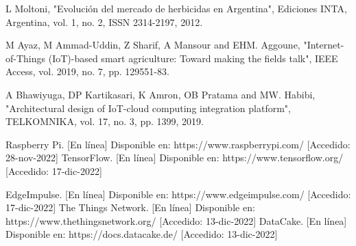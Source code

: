 \documentclass[conference]{IEEEtran}
\begin{document}
\begin{thebibliography}{00}
 L Moltoni, "Evolución del mercado de herbicidas en Argentina", Ediciones INTA, Argentina, vol. 1, no. 2, ISSN 2314-2197, 2012.


 M Ayaz, M Ammad-Uddin, Z Sharif, A Mansour and EHM. Aggoune, "Internet-of-Things (IoT)-based smart agriculture: Toward making the fields talk", IEEE Access, vol. 2019, no. 7, pp. 129551-83.

 A Bhawiyuga, DP Kartikasari, K Amron, OB Pratama and MW. Habibi, "Architectural design of IoT-cloud computing integration platform", TELKOMNIKA, vol. 17, no. 3, pp. 1399, 2019.

 Raspberry Pi. [En línea] Disponible en:
https://www.raspberrypi.com/ [Accedido: 28-nov-2022]  
 TensorFlow. [En línea] Disponible en: https://www.tensorflow.org/ [Accedido: 17-dic-2022] 

 EdgeImpulse. [En línea] Disponible en: https://www.edgeimpulse.com/ [Accedido: 17-dic-2022]
 The Things Network. [En línea] Disponible en: 
https://www.thethingsnetwork.org/ [Accedido: 13-dic-2022] 
 DataCake. [En línea] Disponible en: https://docs.datacake.de/ [Accedido: 13-dic-2022]

\end{thebibliography}
\end{document}
